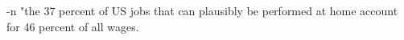 -n "the 37 percent of US jobs that can plausibly be performed at home account for 46 percent of all wages.%
